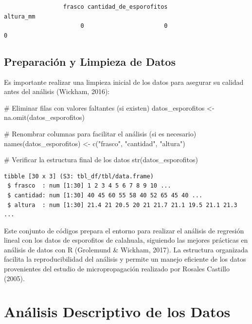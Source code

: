 \documentclass[
  spanish,
  a4paper,
  DIV=11,
  numbers=noendperiod,
  onepage,
  openany]{scrreprt}
\newenvironment{Shaded}{\begin{snugshade}}{\end{snugshade}}
\newcommand{\CommentTok}[1]{\textcolor[rgb]{0.37,0.37,0.37}{#1}}
\newcommand{\FunctionTok}[1]{\textcolor[rgb]{0.28,0.35,0.67}{#1}}
\newcommand{\NormalTok}[1]{\textcolor[rgb]{0.00,0.23,0.31}{#1}}
\newcommand{\OtherTok}[1]{\textcolor[rgb]{0.00,0.23,0.31}{#1}}
\newcommand{\StringTok}[1]{\textcolor[rgb]{0.13,0.47,0.30}{#1}}
\begin{document}
\begin{verbatim}
                 frasco cantidad_de_esporofitos               altura_mm 
                      0                       0                       0 
\end{verbatim}

\subsection{Preparación y Limpieza de
Datos}\label{preparaciuxf3n-y-limpieza-de-datos}

Es importante realizar una limpieza inicial de los datos para asegurar
su calidad antes del análisis (Wickham, 2016):

\begin{Shaded}
\begin{Highlighting}[]
\CommentTok{\# Eliminar filas con valores faltantes (si existen)}
\NormalTok{datos\_esporofitos }\OtherTok{\textless{}{-}} \FunctionTok{na.omit}\NormalTok{(datos\_esporofitos)}

\CommentTok{\# Renombrar columnas para facilitar el análisis (si es necesario)}
\FunctionTok{names}\NormalTok{(datos\_esporofitos) }\OtherTok{\textless{}{-}} \FunctionTok{c}\NormalTok{(}\StringTok{"frasco"}\NormalTok{, }\StringTok{"cantidad"}\NormalTok{, }\StringTok{"altura"}\NormalTok{)}

\CommentTok{\# Verificar la estructura final de los datos}
\FunctionTok{str}\NormalTok{(datos\_esporofitos)}
\end{Highlighting}
\end{Shaded}

\begin{verbatim}
tibble [30 x 3] (S3: tbl_df/tbl/data.frame)
 $ frasco  : num [1:30] 1 2 3 4 5 6 7 8 9 10 ...
 $ cantidad: num [1:30] 40 45 60 55 58 40 52 65 45 40 ...
 $ altura  : num [1:30] 21.4 21 20.5 20 21 21.7 21.1 19.5 21.1 21.3 ...
\end{verbatim}

Este conjunto de códigos prepara el entorno para realizar el análisis de
regresión lineal con los datos de esporofitos de calahuala, siguiendo
las mejores prácticas en análisis de datos con R (Grolemund \& Wickham,
2017). La estructura organizada facilita la reproducibilidad del
análisis y permite un manejo eficiente de los datos provenientes del
estudio de micropropagación realizado por Rosales Castillo (2005).

\section{Análisis Descriptivo de los
Datos}\label{anuxe1lisis-descriptivo-de-los-datos}
\end{document}
